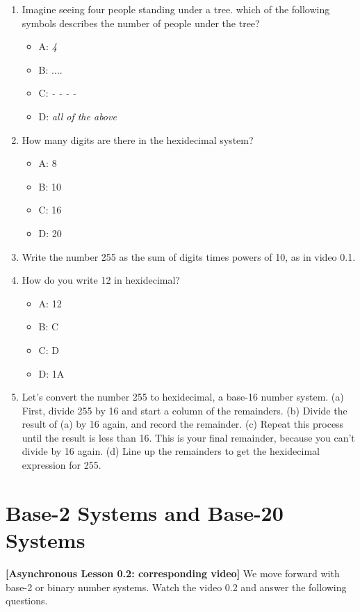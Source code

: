 \documentclass[10pt]{article}
\begin{document}
\begin{enumerate}
\item Imagine seeing four people standing under a tree.  which of the following symbols describes the number of people under the tree?
\begin{itemize}
\item A: \textit{4}
\item B: $....$
\item C: \textit{- - - -}
\item D: \textit{all of the above}
\end{itemize}
\item How many digits are there in the hexidecimal system?
\begin{itemize}
\item A: 8
\item B: 10
\item C: 16
\item D: 20
\end{itemize}
\item Write the number 255 as the sum of digits times powers of 10, as in video 0.1. \\ \vspace{2cm}
\item How do you write 12 in hexidecimal?
\begin{itemize}
\item A: 12
\item B: C
\item C: D
\item D: 1A
\end{itemize}
\item Let's convert the number 255 to hexidecimal, a base-16 number system.  (a) First, divide 255 by 16 and start a column of the remainders.  (b) Divide the result of (a) by 16 again, and record the remainder.  (c) Repeat this process until the result is less than 16.  This is your final remainder, because you can't divide by 16 again.  (d) Line up the remainders to get the hexidecimal expression for 255. \\ \vspace{3cm}
\end{enumerate}

\section{Base-2 Systems and Base-20 Systems}

\textbf{[Asynchronous Lesson 0.2: corresponding video]}  We move forward with base-2 or binary number systems.  Watch the video 0.2 and answer the following questions.
\end{document}
